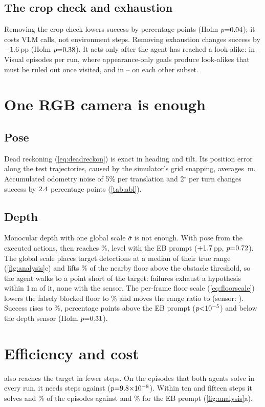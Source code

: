 \subsection{The crop check and exhaustion}
Removing the crop check lowers success by \nAblZoomAbs{} percentage points (Holm $p{=}0.04$); it costs VLM calls,
not environment steps. Removing exhaustion changes success by $-1.6$\,pp (Holm $p{=}0.38$). It acts only after the agent has
reached a look-alike: in \nExhVisLo--\nExhVisHi{} Visual episodes per run, where appearance-only goals produce
look-alikes that must be ruled out once visited, and in \nExhOtherLo--\nExhOtherHi{} on each other subset.

\section{One RGB camera is enough}
\label{sec:exp-sensing}
\label{sec:sensing}
\subsection{Pose}
Dead reckoning (\cref{eq:deadreckon}) is exact in heading and tilt. Its position error along the test trajectories,
caused by the simulator's grid snapping, averages \nDRmean\,m. Accumulated odometry noise of 5\% per translation and
2$^\circ$ per turn changes success by $2.4$ percentage points (\cref{tab:abl}).

\subsection{Depth}
Monocular depth with one global scale $\bar\sigma$ is not enough. With pose from the executed actions, \ours then
reaches \nRGBGlobal\%, level with the EB prompt ($+1.7$\,pp, $p{=}0.72$). The global scale places target
detections at a median \nRangeGlobal{} of their true range (\cref{fig:analysis}c) and lifts \nBlockGlobal\% of the
nearby floor above the obstacle threshold, so the agent walks to a point short of the target: \nShortGlobal{} failures
exhaust a hypothesis within 1\,m of it, none with the sensor. The per-frame floor scale (\cref{eq:floorscale}) lowers
the falsely blocked floor to \nBlockFloor\% and moves the range ratio to \nRangeFloor{} (sensor: \nRangeSensor).
Success rises to \nRGBThree\%, \nGainRGB{} percentage points above the EB prompt ($p{<}10^{-5}$) and \nGapRGBAbs{}
below the depth sensor (Holm $p{=}0.31$).

\section{Efficiency and cost}
\label{sec:exp-efficiency}
\ours also reaches the target in fewer steps. On the \nStepN{} episodes that both agents solve in every run, it needs
\nStepS{} steps against \nStepEB{} ($p{=}9.8{\times}10^{-8}$). Within ten and fifteen steps it solves \nBudSTen{} and \nBudSFifteen\%
of the episodes against \nBudEBTen{} and \nBudEBFifteen\% for the EB prompt (\cref{fig:analysis}a).

